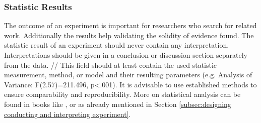 \subsubsection{Statistic Results}

The outcome of an experiment is important for researchers who search for related work. Additionally the results help validating the solidity of evidence found. The statistic result of an experiment should never contain any interpretation. Interpretations should be given in a conclusion or discussion section separately from the data. //
This field should at least contain the used statistic measurement, method, or model and their resulting parameters (e.g. Analysis of Variance: F(2.57)=211.496, p<.001). It is advisable to use established methods to ensure comparability and reproducibility. More on statistical analysis can be found in books like \cite{Wohlin2012}, or \cite{Albert2008} as already mentioned in Section \ref{subsec:designing conducting and interpreting experiment}.

